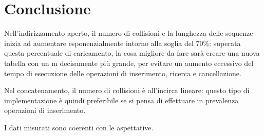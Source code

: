 \documentclass[]{article}
\begin{document}
\section{Conclusione}
Nell'indirizzamento aperto, il numero di collisioni e la lunghezza delle sequenze inizia ad aumentare esponenzialmente intorno alla soglia del 70\%: superata questa percentuale di caricamento, la cosa migliore da fare sarà creare una nuova tabella con un m decisamente più grande, per evitare un aumento eccessivo del tempo di esecuzione delle operazioni di inserimento, ricerca e cancellazione.

Nel concatenamento, il numero di collisioni è all'incirca lineare: questo tipo di implementazione è quindi preferibile se si pensa di effettuare in prevalenza operazioni di inserimento.

I dati misurati sono coerenti con le aspettative.
\end{document}
